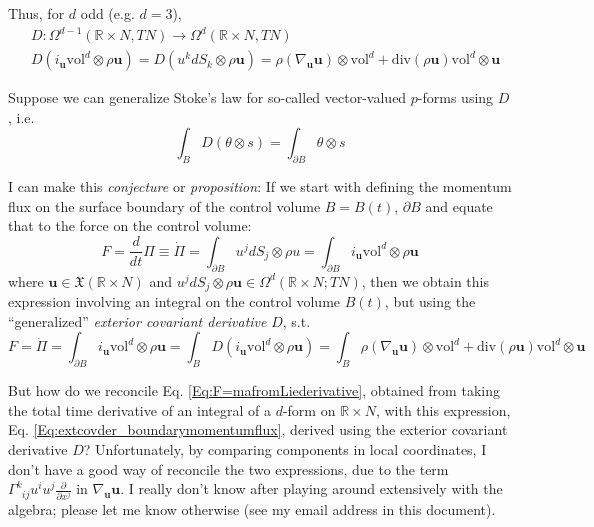 \documentclass[twoside,landscape,10pt]{amsart}
\theoremstyle{plain}
\theoremstyle{definition}
\theoremstyle{remark}
\theoremstyle{remark}
\begin{document}
\begin{multicols*}{2}
Thus, for $d$ odd (e.g. $d=3$), 
\begin{equation}\label{Eq:extcovder_boundarymomentumflux}
  \boxed{
    \begin{aligned}
      & D : \Omega^{d-1}(\mathbb{R} \times N, TN) \to \Omega^d(\mathbb{R}\times N,TN) \\ 
      & D(i_{\mathbf{u}} \text{vol}^d \otimes \rho \mathbf{u}) = D( u^k dS_k \otimes \rho \mathbf{u} ) = \rho(\nabla_{\mathbf{u}} \mathbf{u} ) \otimes \text{vol}^d + \text{div}(\rho \mathbf{u}) \text{vol}^d \otimes \mathbf{u}
\end{aligned}
}
\end{equation}

Suppose we can generalize Stoke's law for so-called vector-valued $p$-forms using $D$, i.e.
\[
\int_B D(\theta \otimes s) = \int_{\partial B} \theta \otimes s
\]


I can make this \emph{conjecture} or \emph{proposition}: If we start with defining the momentum flux on the surface boundary of the control volume $B=B(t)$, $\partial B$ and equate that to the force on the control volume:
\[
F = \frac{d}{dt} \Pi \equiv \dot{\Pi} = \int_{\partial B} u^j dS_j \otimes \rho u = \int_{\partial B} i_{\mathbf{u}}\text{vol}^d \otimes \rho \mathbf{u}
\]
where $\mathbf{u} \in \mathfrak{X}(\mathbb{R}\times N)$ and $u^jdS_j \otimes \rho \mathbf{u} \in \Omega^d(\mathbb{R} \times N; TN)$, then we obtain this expression involving an integral on the control volume $B(t)$, but using the ``generalized'' \emph{exterior covariant derivative} $D$, s.t. 
\begin{equation}\label{Eq:F=ma_extcovder}
  F = \dot{\Pi} = \int_{\partial B} i_{\mathbf{u}} \text{vol}^d \otimes \rho \mathbf{u} = \int_B D(i_{\mathbf{u}} \text{vol}^d\otimes \rho \mathbf{u}) = \int_B \rho (\nabla_{\mathbf{u}} \mathbf{u} ) \otimes \text{vol}^d + \text{div}(\rho \mathbf{u}) \text{vol}^d \otimes \mathbf{u}
\end{equation}


But how do we reconcile Eq. \ref{Eq:F=mafromLiederivative}, obtained from taking the total time derivative of an integral of a $d$-form on $\mathbb{R} \times N$, with this expression, Eq. \ref{Eq:extcovder_boundarymomentumflux}, derived using the exterior covariant derivative $D$?  Unfortunately, by comparing components in local coordinates, I don't have a good way of reconcile the two expressions, due to the term $\Gamma^k_{ \; \; ij} u^i u^j \frac{ \partial }{ \partial x^j}$ in $\nabla_{\mathbf{u}} \mathbf{u}$.  I really don't know after playing around extensively with the algebra; please let me know otherwise (see my email address in this document).  


\end{multicols*}
\end{document}
